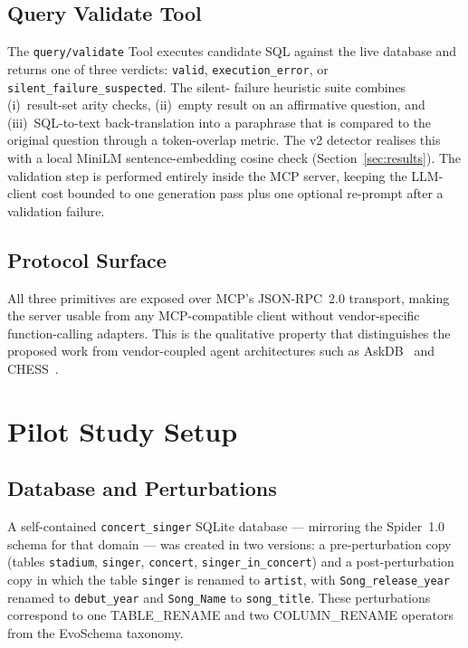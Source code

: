 \documentclass[conference,10pt,a4paper]{IEEEtran}
\begin{document}
\subsection{Query Validate Tool}
The \texttt{query/validate} Tool executes candidate SQL against the live
database and returns one of three verdicts: \texttt{valid},
\texttt{execution\_error}, or \texttt{silent\_failure\_suspected}. The silent-
failure heuristic suite combines (i)~result-set arity checks, (ii)~empty
result on an affirmative question, and (iii)~SQL-to-text back-translation
into a paraphrase that is compared to the original question through a
token-overlap metric. The v2 detector realises this with a local
MiniLM sentence-embedding cosine check
(Section~\ref{sec:results}). The validation step is performed
entirely inside the MCP server, keeping the LLM-client cost bounded to one
generation pass plus one optional re-prompt after a validation failure.

\subsection{Protocol Surface}
All three primitives are exposed over MCP's JSON-RPC~2.0 transport, making
the server usable from any MCP-compatible client without
vendor-specific function-calling adapters. This is the qualitative property
that distinguishes the proposed work from vendor-coupled agent
architectures such as AskDB~\cite{phan2025askdb} and
CHESS~\cite{talaei2024chess}.

\section{Pilot Study Setup}

\subsection{Database and Perturbations}
A self-contained \texttt{concert\_singer} SQLite database — mirroring the
Spider~1.0 schema for that domain — was created in two versions: a
pre-perturbation copy (tables \texttt{stadium}, \texttt{singer},
\texttt{concert}, \texttt{singer\_in\_concert}) and a post-perturbation
copy in which the table \texttt{singer} is renamed to \texttt{artist}, with
\texttt{Song\_release\_year} renamed to \texttt{debut\_year} and
\texttt{Song\_Name} to \texttt{song\_title}. These perturbations correspond
to one TABLE\_RENAME and two COLUMN\_RENAME operators from the
EvoSchema taxonomy.
\end{document}
